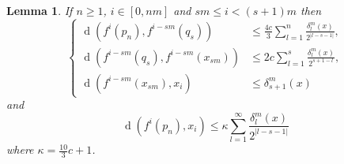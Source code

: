 \documentclass[12pt]{amsart}
\theoremstyle{plain}
\newtheorem{lem}[thm]{Lemma}
\theoremstyle{definition}
\theoremstyle{remark}
\DeclareMathOperator{\dist}{d}
\begin{document}
\begin{lem}
	\label{lemBowenShdowing2}
	If $n\geq 1$, $i\in[0,nm]$ and
	$sm\leq i<(s+1)m$ then
	\[
	\left\{
	\begin{array}{rl}
		\dist(f^i(p_n),f^{i-sm}(q_s))         &\leq \frac{4c}{3}
			\sum_{l=1}^n\frac{\delta_l^m(x)}{2^{|l-s-1|}},\\
		\dist(f^{i-sm}(q_s),f^{i-sm}(x_{sm})) &\leq 2c \sum_{l=1}^s\frac{\delta_l^m(x)}{2^{s+1-l}},\\
		\dist(f^{i-sm}(x_{sm}),x_i)           &\leq \delta_{s+1}^m(x)
	\end{array}
	\right.
	\]
	and
	\begin{equation}
		\label{ecucotap_n}
	\dist(f^i(p_n),x_i)\leq \kappa \sum_{l=1}^\infty\frac{\delta_l^m(x)}{2^{|l-s-1|}}
	\end{equation}
	where $\kappa=\frac{10}{3}c+1$.
\end{lem}
\end{document}
